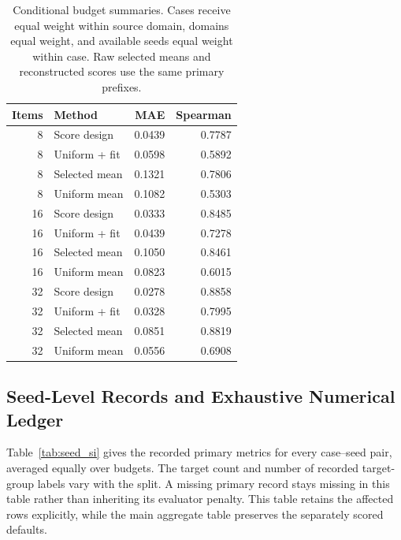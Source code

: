 \documentclass{article}
\begin{document}
\begin{table}[h]
\centering
\caption{Conditional budget summaries. Cases receive equal weight within source domain, domains equal weight, and available seeds equal weight within case. Raw selected means and reconstructed scores use the same primary prefixes.}
\label{tab:budget_si}
\begin{tabular}{rlrr}
\toprule
Items & Method & MAE & Spearman\\
\midrule
8 & Score design & 0.0439 & 0.7787 \\
8 & Uniform + fit & 0.0598 & 0.5892 \\
8 & Selected mean & 0.1321 & 0.7806 \\
8 & Uniform mean & 0.1082 & 0.5303 \\
16 & Score design & 0.0333 & 0.8485 \\
16 & Uniform + fit & 0.0439 & 0.7278 \\
16 & Selected mean & 0.1050 & 0.8461 \\
16 & Uniform mean & 0.0823 & 0.6015 \\
32 & Score design & 0.0278 & 0.8858 \\
32 & Uniform + fit & 0.0328 & 0.7995 \\
32 & Selected mean & 0.0851 & 0.8819 \\
32 & Uniform mean & 0.0556 & 0.6908 \\
\bottomrule
\end{tabular}
\end{table}

\subsection{Seed-Level Records and Exhaustive Numerical Ledger}
Table~\ref{tab:seed_si} gives the recorded primary metrics for every case--seed pair, averaged equally over budgets. The target count and number of recorded target-group labels vary with the split. A missing primary record stays missing in this table rather than inheriting its evaluator penalty. This table retains the affected rows explicitly, while the main aggregate table preserves the separately scored defaults.
\end{document}
